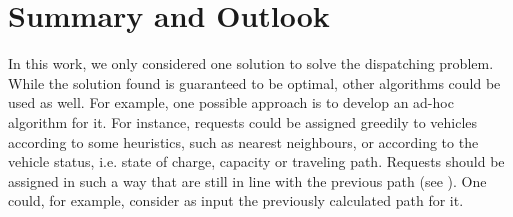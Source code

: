 \chapter{Summary and Outlook}

In this work, we only considered one solution to solve the dispatching problem. While the solution found is guaranteed to be optimal, other algorithms could be used as well. For example, one possible approach is to develop an ad-hoc algorithm for it. For instance, requests could be assigned greedily to vehicles according to some heuristics, such as nearest neighbours, or according to the vehicle status, i.e. state of charge, capacity or traveling path. Requests should be assigned in such a way that are still in line with the previous path (see ). One could, for example, consider as input the previously calculated path for it. 